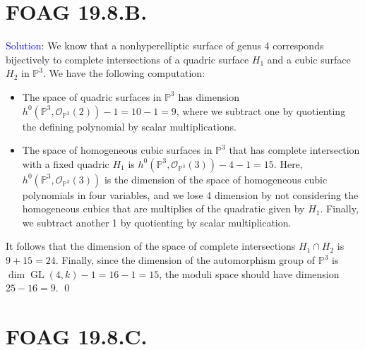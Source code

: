 \documentclass[11pt]{article}
\newcommand{\PP}{\mathbb{P}}
\newcommand{\cO}{\mathcal{O}}
\newcommand{\GL}{\operatorname{GL}}
\newenvironment{solution}{\begin{trivlist}\item[]{\textcolor{blue}{Solution:}}}{\qed \end{trivlist}}
\begin{document}
\newpage

\section*{FOAG 19.8.B.}

\begin{solution}
    We know that a nonhyperelliptic surface of genus 4 corresponds bijectively to complete intersections of a quadric surface $H_1$ and a cubic surface $H_2$ in $\PP^3$. We have the following computation:
    \begin{itemize}
        \item The space of quadric surfaces in $\PP^3$ has dimension $h^0(\PP^3, \cO_{\PP^3}(2)) - 1 = 10 - 1 = 9$, where we subtract one by quotienting the defining polynomial by scalar multiplications. 
        \item The space of homogeneous cubic surfaces in $\PP^3$ that has complete intersection with a fixed quadric $H_1$ is $h^0(\PP^3, \cO_{\PP^3}(3)) - 4 - 1 = 15$. Here, $h^0(\PP^3, \cO_{\PP^3}(3))$ is the dimension of the space of homogeneous cubic polynomials in four variables, and we lose 4 dimension by not considering the homogeneous cubics that are multiplies of the quadratic given by $H_1$. Finally, we subtract another 1 by quotienting by scalar multiplication. 
    \end{itemize}
    It follows that the dimension of the space of complete intersections $H_1 \cap H_2$ is $9 + 15 = 24$. Finally, since the dimension of the automorphism group of $\PP^3$ is $\dim \GL(4, k) - 1 = 16 - 1 = 15$, the moduli space should have dimension $25 - 16 = 9$. 
\end{solution}

\newpage

\section*{FOAG 19.8.C.}
\end{document}
